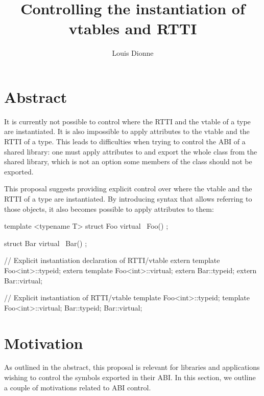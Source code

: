 \documentclass{wg21}
\title{Controlling the instantiation of vtables and RTTI}
\author{Louis Dionne}{ldionne@apple.com}
\begin{document}
\maketitle

\section{Abstract}
It is currently not possible to control where the RTTI and the vtable of a type
are instantiated. It is also impossible to apply attributes to the vtable and
the RTTI of a type. This leads to difficulties when trying to control the ABI
of a shared library: one must apply attributes to and export the whole class
from the shared library, which is not an option some members of the class
should not be exported.

This proposal suggests providing explicit control over where the vtable and
the RTTI of a type are instantiated. By introducing syntax that allows referring
to those objects, it also becomes possible to apply attributes to them:

\begin{cpp}
template <typename T>
struct Foo { virtual ~Foo() { } };

struct Bar { virtual ~Bar() { } };

// Explicit instantiation declaration of RTTI/vtable
extern template Foo<int>::typeid;
extern template Foo<int>::virtual;
extern Bar::typeid;
extern Bar::virtual;

// Explicit instantiation of RTTI/vtable
template Foo<int>::typeid;
template Foo<int>::virtual;
Bar::typeid;
Bar::virtual;
\end{cpp}


\section{Motivation}
As outlined in the abstract, this proposal is relevant for libraries and
applications wishing to control the symbols exported in their ABI. In this
section, we outline a couple of motivations related to ABI control.
\end{document}
